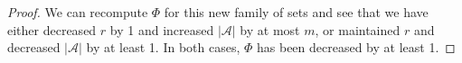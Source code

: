 \documentclass[12pt]{article}
\theoremstyle{plain}
\theoremstyle{definition}
\theoremstyle{remark}
\newcommand{\F}{\mathcal{F}}
\newcommand{\A}{\mathcal{A}}
\newcommand{\B}{\mathcal{B}}
\begin{document}
\begin{proof}
We can recompute $\Phi$ for this new family of sets and see that we have either decreased $r$ by 1 and increased $|\A|$ by at most $m$, or maintained $r$ and decreased $|\A|$ by at least 1. In both cases, $\Phi$ has been decreased by at least 1.

\end{proof}
\end{document}
